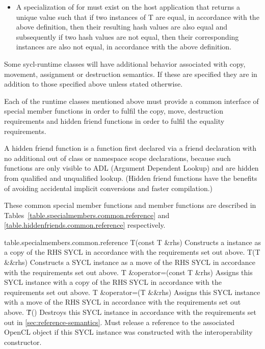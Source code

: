 \begin{itemize}
\item A specialization of  for  must exist on the host application that returns a unique value such that if two instances of T are equal, in accordance with the above definition, then their resulting hash values are also equal and subsequently if two hash values are not equal, then their corresponding instances are also not equal, in accordance with the above definition.

\end{itemize}

Some \gls{sycl-runtime} classes will have additional behavior associated with copy, movement, assignment or destruction semantics. If these are specified they are in addition to those specified above unless stated otherwise.

Each of the runtime classes mentioned above must provide a common interface of special member functions in order to fulfil the copy, move, destruction requirements and hidden friend functions in order to fulfil the equality requirements.

A hidden friend function is a function first declared via a friend declaration with no additional out of class or namespace scope declarations, because such functions are only visible to ADL (Argument Dependent Lookup) and are hidden from qualified and unqualified lookup.  (Hidden friend functions have the benefits of avoiding accidental implicit conversions and faster compilation.)

These common special member functions and member functions are described in Tables~\ref{table.specialmembers.common.reference} and \ref{table.hiddenfriends.common.reference} respectively.



{table.specialmembers.common.reference}
  \addRow
    {T(const T \&rhs)}
    {
      Constructs a  instance as a copy of the RHS SYCL  in accordance with the requirements set out above.
    }
  \addRow
    {T(T \&\&rhs)}
    {
      Constructs a SYCL  instance as a move of the RHS SYCL  in accordance with the requirements set out above.
    }  
   \addRow
   {T \&operator=(const T \&rhs)}
   {
     Assigns this SYCL  instance with a copy of the RHS SYCL  in accordance with the requirements set out above.
   }
   \addRow
   {T \&operator=(T \&\&rhs)}
   {
     Assigns this SYCL  instance with a move of the RHS SYCL  in accordance with the requirements set out above.
   }
   \addRow
   {\~T()}
   {
     Destroys this SYCL  instance in accordance with the requirements set out in \ref{sec:reference-semantics}.
     Must release a reference to the associated OpenCL object if this SYCL  instance was constructed with the interoperability constructor.
   }
\completeTable

